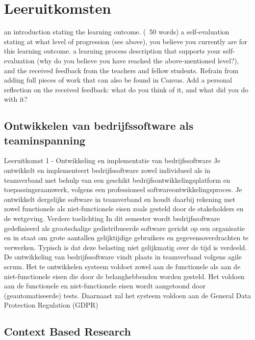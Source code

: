\chapter{Leeruitkomsten}
\label{ch:learning_outcomes}


an introduction stating the learning outcome. (~50 words)
a self-evaluation stating at what level of progression (see above), you believe you currently are for this learning outcome.
a learning process description that supports your self-evaluation (why do you believe you have reached the above-mentioned level?), and the received feedback from the teachers and fellow students.
Refrain from adding full pieces of work that can also be found in Canvas.
Add a personal reflection on the received feedback: what do you think of it, and what did you do with it?






\section{Ontwikkelen van bedrijfssoftware als teaminspanning}\label{sec:ontwikkelen-van-bedrijfssoftware-als-teaminspanning}

Leeruitkomst 1 - Ontwikkeling en implementatie van bedrijfssoftware Je ontwikkelt en implementeert bedrijfssoftware
zowel
individueel als in teamverband met behulp van een geschikt bedrijfsontwikkelingsplatform en toepassingsraamwerk, volgens een professioneel softwareontwikkelingsproces.
Je ontwikkelt dergelijke software in teamverband en houdt daarbij rekening met zowel functionele als niet-functionele eisen zoals gesteld door de stakeholders en de wetgeving.
Verdere toelichting In dit semester wordt bedrijfssoftware gedefinieerd als grootschalige gedistribueerde software gericht op een organisatie en in staat om grote aantallen gelijktijdige gebruikers en gegevensoverdrachten te verwerken.
Typisch is dat deze belasting niet gelijkmatig over de tijd is verdeeld.
De ontwikkeling van bedrijfssoftware vindt plaats in teamverband volgens agile scrum.
Het te ontwikkelen systeem voldoet zowel aan de functionele als aan de niet-functionele eisen die door de belanghebbenden worden gesteld.
Het voldoen aan de functionele en niet-functionele eisen wordt aangetoond door (geautomatiseerde) tests.
Daarnaast zal het systeem voldoen aan de General Data Protection Regulation (GDPR)





\section{Context Based Research}\label{sec:context-based-research}

